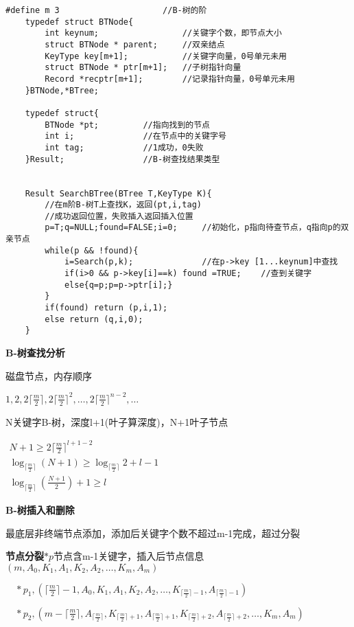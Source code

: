 \documentclass[UTF8]{ctexart}
\newcommand{\mb}[1]{\textbf{#1}}
\newcommand{\mfd}[1]{ \lceil #1 \rceil}
\newcommand{\q}{\quad}
\newcommand{\p}{\par}
\newcommand{\ma}[1]{\begin{array}{llll} #1 \end{array}}
\begin{document}

\begin{lstlisting}[style=v1]
    #define m 3                     //B-树的阶
    typedef struct BTNode{
        int keynum;                 //关键字个数，即节点大小
        struct BTNode * parent;     //双亲结点   
        KeyType key[m+1];           //关键字向量，0号单元未用
        struct BTNode * ptr[m+1];   //子树指针向量
        Record *recptr[m+1];        //记录指针向量，0号单元未用
    }BTNode,*BTree;

    typedef struct{
        BTNode *pt;         //指向找到的节点
        int i;              //在节点中的关键字号    
        int tag;            //1成功，0失败
    }Result;                //B-树查找结果类型


    Result SearchBTree(BTree T,KeyType K){
        //在m阶B-树T上查找K，返回(pt,i,tag)
        //成功返回位置，失败插入返回插入位置
        p=T;q=NULL;found=FALSE;i=0;     //初始化，p指向待查节点，q指向p的双亲节点
        while(p && !found){
            i=Search(p,k);              //在p->key [1...keynum]中查找
            if(i>0 && p->key[i]==k) found =TRUE;    //查到关键字
            else{q=p;p=p->ptr[i];}
        }
        if(found) return (p,i,1);
        else return (q,i,0);
    }
\end{lstlisting}

\mb{B-树查找分析}\p

磁盘节点，内存顺序

$1,2,2\mfd{\frac{m}{2}},2\mfd{\frac{m}{2}}^2,\dots,2\mfd{\frac{m}{2}}^{n-2},\dots$

N关键字B-树，深度l+1(叶子算深度)，N+1叶子节点

$\ma{N+1\geqslant 2\mfd{\frac{m}{2}}^{l+1-2}\\
    \log_{\mfd{\frac{m}{2}}} (N+1) \geqslant \log_{\mfd{\frac{m}{2}}} 2 +l-1\\
    \log_{\mfd{\frac{m}{2}}} (\frac{N+1}{2}) +1 \geqslant  l
}$

\mb{B-树插入和删除}\p


最底层非终端节点添加，添加后关键字个数不超过m-1完成，超过分裂

\mb{节点分裂}$*p$节点含m-1关键字，插入后节点信息$(m,A_0,K_1,A_1,K_2,A_2,\dots,K_m,A_m)$

$\q *p_1,(\mfd{\frac{m}{2}}-1,A_0,K_1,A_1,K_2,A_2,\dots,K_{\mfd{\frac{m}{2}}-1},A_{\mfd{\frac{m}{2}}-1}) $

$\q *p_2,(m-\mfd{\frac{m}{2}},A_{\mfd{\frac{m}{2}}},K_{\mfd{\frac{m}{2}}+1},A_{\mfd{\frac{m}{2}}+1},K_{\mfd{\frac{m}{2}}+2},A_{\mfd{\frac{m}{2}}+2},\dots,K_m,A_m) $
\end{document}
